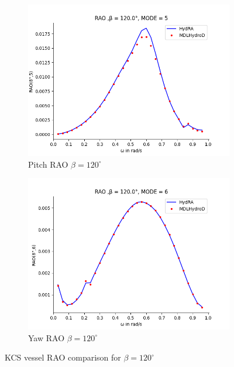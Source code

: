 \begin{figure}[H]
\begin{subfigure}[b]{0.45\textwidth}
        \includegraphics[width=\textwidth]{plots/kcs/rao/rao5.png}
        \caption{Pitch RAO $\beta = 120^{\circ}$}
    \end{subfigure}
    \begin{subfigure}[b]{0.45\textwidth}
        \includegraphics[width=\textwidth]{plots/kcs/rao/rao6.png}
        \caption{Yaw RAO $\beta = 120^{\circ}$}
    \end{subfigure}
    \caption{KCS vessel RAO comparison for $\beta = 120^{\circ}$}
    \label{fig:kvlcc_rao_120}
\end{figure}
